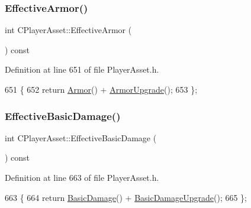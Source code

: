 \subsubsection{\texorpdfstring{Effective\+Armor()}{EffectiveArmor()}}
{\footnotesize\ttfamily int C\+Player\+Asset\+::\+Effective\+Armor (\begin{DoxyParamCaption}{ }\end{DoxyParamCaption}) const\hspace{0.3cm}{\ttfamily [inline]}}



Definition at line 651 of file Player\+Asset.\+h.


\begin{DoxyCode}
651                                   \{
652             \textcolor{keywordflow}{return} \hyperlink{classCPlayerAsset_a3de4826a7d7e8d2c5fd325ec736567ab}{Armor}() + \hyperlink{classCPlayerAsset_a1312cb77efe2cf732cc255a8345e7c44}{ArmorUpgrade}();
653         \};
\end{DoxyCode}
\hypertarget{classCPlayerAsset_a13b40b2b670c86fb2d1f319837eca2da}{}\label{classCPlayerAsset_a13b40b2b670c86fb2d1f319837eca2da} 
\subsubsection{\texorpdfstring{Effective\+Basic\+Damage()}{EffectiveBasicDamage()}}
{\footnotesize\ttfamily int C\+Player\+Asset\+::\+Effective\+Basic\+Damage (\begin{DoxyParamCaption}{ }\end{DoxyParamCaption}) const\hspace{0.3cm}{\ttfamily [inline]}}



Definition at line 663 of file Player\+Asset.\+h.


\begin{DoxyCode}
663                                         \{
664             \textcolor{keywordflow}{return} \hyperlink{classCPlayerAsset_a17dcdcd436e6edfab325bc4dbca4f03c}{BasicDamage}() + \hyperlink{classCPlayerAsset_affad00c05e4a1325601f2dc23df1cf05}{BasicDamageUpgrade}();
665         \};
\end{DoxyCode}
\hypertarget{classCPlayerAsset_a180f67342aa933dbf0918759714858e3}{}\label{classCPlayerAsset_a180f67342aa933dbf0918759714858e3} 

